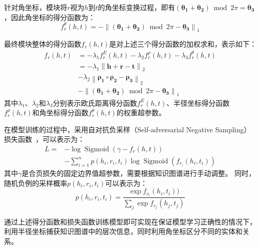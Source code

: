 \documentclass[algorithmlist, AutoFakeBold, AutoFakeSlant, figurelist, tablelist, nomlist, engineering, openany]{seuthesix} %
\begin{document}
针对角坐标，模块将$r$视为$h$到$t$的角坐标变换过程，即有$(\bm{\theta_1} + \bm{\theta_2}) \bmod 2 \pi = \bm{\theta_3}$，因此角坐标的得分函数为：
\begin{equation}
  f^{\theta}_r\left(h, t\right) =-\left\|\left(\bm{\theta_1}+\bm{\theta_2}\right) \bmod 2 \pi - \bm{\theta_3}\right\|_1
\end{equation}

最终模块整体的得分函数$f_r(h, t)$是对上述三个得分函数的加权求和，表示如下：
\begin{equation}
  \begin{aligned}
    f_r\left(h, t\right) &= -\lambda_1 f^{E}_r(h, t) -\lambda_2 f^{\rho}_r(h, t) -\lambda_3 f^{\theta}_r(h, t) \\
    &= -\lambda_1 \left\|\bm{h} + \bm{r} - \bm{t}\right\|_2 \\
    &-\lambda_2 \left\|\bm{\rho_1} \circ \bm{\rho_2} - \bm{\rho_3}\right\|_2 \\
    &-\left\|\left(\bm{\theta_1}+\bm{\theta_2}\right) \bmod 2 \pi - \bm{\theta_3}\right\|_1
  \end{aligned}
  \label{f_1}
\end{equation}
其中$\lambda_1$、$\lambda_2$和$\lambda_3$分别表示欧氏距离得分函数$f^E_r(h, t)$、半径坐标得分函数$f^{\rho}_r(h, t)$和角坐标得分函数$f^{\theta}_r(h, t)$的权重超参数。

在模型训练的过程中，采用自对抗负采样（Self-adversarial Negative Sampling）损失函数~\cite{sun2018rotate}，可以表示为：
\begin{equation}
  \begin{aligned}
  L= & -\log \operatorname{Sigmoid}\left(\gamma-f_r(h, t)\right) \\
  & -\sum_{i=1}^n p\left(h_i, r_i, t_i\right) \log \operatorname{Sigmoid}(f_{r_i}(h_i, t_i))
  \end{aligned}
  \label{loss_1}
\end{equation}
其中$\gamma$是合页损失的固定边界值超参数，需要根据知识图谱进行手动调整。
同时，随机负例的采样概率$p(h_i, r_i, t_i)$可以表示为：
\begin{equation}
  p(h_i, r_i, t_i)=\frac{\exp f_{r_i}(h_i, t_i))}{\sum_j \exp f_{r_j}(h_j, t_j)}
\end{equation}

通过上述得分函数和损失函数训练模型即可实现在保证模型学习正确性的情况下，利用半径坐标捕获知识图谱中的层次信息，同时利用角坐标区分不同的实体和关系。

\end{document}
